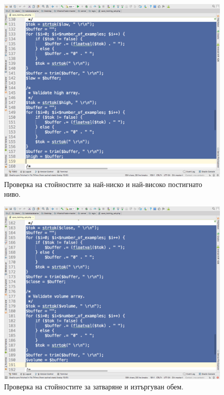 \documentclass[book,14pt,oneside,openany]{memoir}
\begin{document}
\begin{figure}[h]
  \centering
  \includegraphics[height=0.45\pdfpageheight]{pic0151}
  \caption{Проверка на стойностите за най-ниско и най-високо постигнато ниво.}
\label{fig:pic0151}
\end{figure}
\FloatBarrier

\begin{figure}[h]
  \centering
  \includegraphics[height=0.45\pdfpageheight]{pic0152}
  \caption{Проверка на стойностите за затваряне и изтъргуван обем.}
\label{fig:pic0152}
\end{figure}
\FloatBarrier
\end{document}

